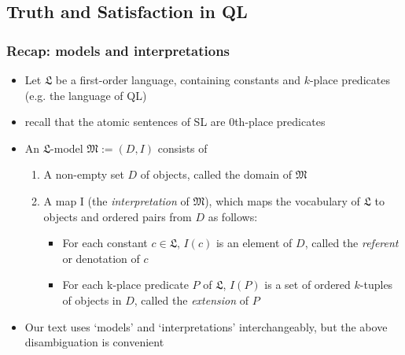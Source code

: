 \subsection{Truth and Satisfaction in QL}

\begin{frame}
\frametitle{Recap: models and interpretations}

\begin{itemize}[<+->]

\item Let $\mathfrak{L}$ be a first-order language, containing constants and $k$-place predicates (e.g. the language of QL)
\bi
\item recall that the atomic sentences of SL are 0th-place predicates
\ei
\item An $\mathfrak{L}$-model $\mathfrak{M} := (D, I)$ consists of

\begin{enumerate}

\item A non-empty set $D$ of objects, called the domain of   $\mathfrak{M}$

\item A map I (the \textit{interpretation} of $\mathfrak{M}$), which maps the vocabulary of $\mathfrak{L}$ to objects and ordered pairs from $D$ as follows:

\begin{itemize}

\item For each constant $c \in \mathfrak{L}$, $I(c)$ is an element of $D$, called the \textit{referent} or denotation of $c$

\item For each k-place predicate $P$ of $\mathfrak{L}$, $I(P)$ is a set of ordered $k$-tuples of objects in $D$, called the \textit{extension} of $P$

\end{itemize}

\end{enumerate}

\item Our text uses `models' and `interpretations' interchangeably, but the above disambiguation is convenient

\end{itemize}
\end{frame}

